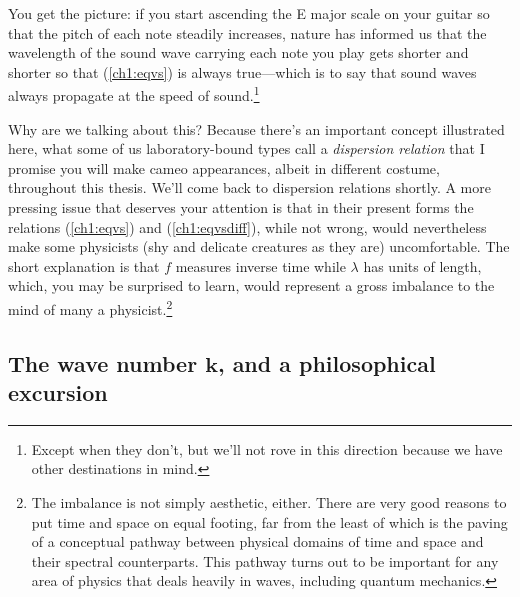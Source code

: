 You get the picture: if you start ascending the E major scale on your guitar so
that the pitch of each note steadily increases, nature has informed us that the
wavelength of the sound wave carrying each note you play gets shorter and
shorter so that (\ref{ch1:eqvs}) is always true---which is to say that sound
waves always propagate at the speed of sound.\footnote{Except when they don't,
  but we'll not rove in this direction because we have other destinations in
  mind.}

Why are we talking about this? Because there's an important concept illustrated
here, what some of us laboratory-bound types call a \emph{dispersion relation}
that I promise you will make cameo appearances, albeit in different costume,
throughout this thesis. We'll come back to dispersion relations shortly. A more
pressing issue that deserves your attention is that in their present forms the
relations (\ref{ch1:eqvs}) and (\ref{ch1:eqvsdiff}), while not wrong, would
nevertheless make some physicists (shy and delicate creatures as they are)
uncomfortable. The short explanation is that $f$ measures inverse time while
$\lambda$ has units of length, which, you may be surprised to learn, would
represent a gross imbalance to the mind of many a physicist.\footnote{The
  imbalance is not simply aesthetic, either. There are very good reasons to put
  time and space on equal footing, far from the least of which is the paving of
  a conceptual pathway between physical domains of time and space and their
  spectral counterparts. This pathway turns out to be important for any area of
  physics that deals heavily in waves, including quantum mechanics.}

\subsection{The wave number $\mathbf{k}$, and a philosophical excursion}
\label{subsec:k}

